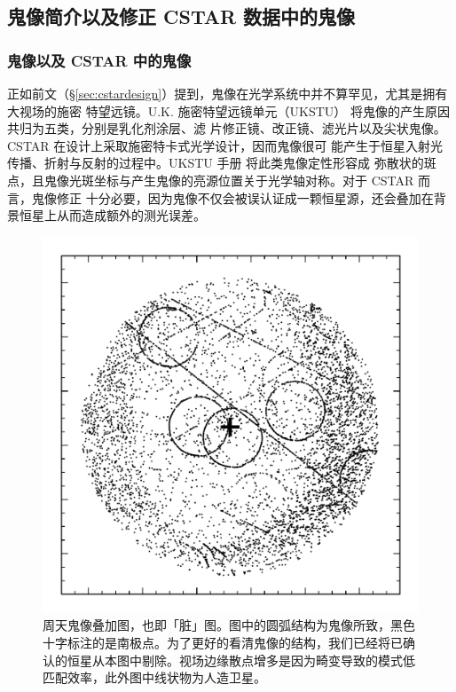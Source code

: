 \subsection{鬼像简介以及修正 CSTAR 数据中的鬼像} \label{sec:ghost}

\subsubsection{鬼像以及 CSTAR 中的鬼像}
正如前文（\S \ref{sec:cstardesign}）提到，鬼像在光学系统中并不算罕见，尤其是拥有大视场的施密
特望远镜。U.K. 施密特望远镜单元（UKSTU） 将鬼像的产生原因共归为五类，分别是乳化剂涂层、滤
片修正镜、改正镜、滤光片以及尖状鬼像。CSTAR 在设计上采取施密特卡式光学设计，因而鬼像很可
能产生于恒星入射光传播、折射与反射的过程中。UKSTU 手册\cite{1983ukstu} 将此类鬼像定性形容成
弥散状的斑点，且鬼像光斑坐标与产生鬼像的亮源位置关于光学轴对称。对于 CSTAR 而言，鬼像修正
十分必要，因为鬼像不仅会被误认证成一颗恒星源，还会叠加在背景恒星上从而造成额外的测光误差。

\begin{figure}[t]
\centering
\includegraphics[width=1.0\textwidth]{figures/chapter2/f3_ghoststack.pdf}
\caption{周天鬼像叠加图，也即「脏」图。图中的圆弧结构为鬼像所致，黑色十字标注的是南极点。为了更好的看清鬼像的结构，我们已经将已确认的恒星从本图中剔除。视场边缘散点增多是因为畸变导致的模式低匹配效率，此外图中线状物为人造卫星。}
\label{fig:ghoststack}
\end{figure}

